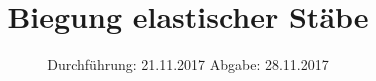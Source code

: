 

\subject{V103}
\title{Biegung elastischer Stäbe}
\date{%
  Durchführung: 21.11.2017
  \hspace{3em}
  Abgabe: 28.11.2017
}



\maketitle
\thispagestyle{empty}
\tableofcontents
\newpage






\printbibliography{}


